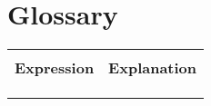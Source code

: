 \chapter{Glossary}
\begin{table}[H]
  \begin{tabularx}{\textwidth}{l X}\hline                    \\
    \textbf{Expression} & \textbf{Explanation} \\ \\\hline \\
    \\\hline
  \end{tabularx}
\end{table}